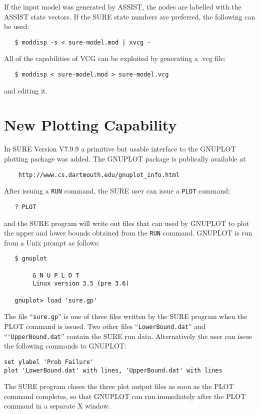 If the input model was generated by ASSIST, the nodes are labelled with the
ASSIST state vectors.  If the SURE state numbers are preferred, the following can be used:
\begin{verbatim}
   $ moddisp -s < sure-model.mod | xvcg -
\end{verbatim}
All of the capabilities of VCG can be exploited by generating a .vcg file:
\begin{verbatim}
   $ moddisp < sure-model.mod > sure-model.vcg
\end{verbatim}
and editing it.


\section{New Plotting Capability}

In SURE Version V7.9.9 a primitive but usable interface to the GNUPLOT plotting
package was added.  The GNUPLOT package is publically available at
\begin{verbatim}
    http://www.cs.dartmouth.edu/gnuplot_info.html
\end{verbatim}
After issuing a \verb|RUN| command, the SURE user can issue a \verb|PLOT| command:
\begin{verbatim}
   ? PLOT
\end{verbatim}
and the SURE program will write out files that can used by GNUPLOT to plot the 
upper and lower bounds obtained from the \verb|RUN| command.
GNUPLOT is run from a Unix prompt as follows:
\begin{verbatim}
   $ gnuplot

        G N U P L O T
        Linux version 3.5 (pre 3.6)

   gnuplot> load 'sure.gp'

\end{verbatim}
The file ``\verb|sure.gp|'' is one of three files written by the SURE
program when the PLOT command is issued.  Two other files ``\verb|LowerBound.dat|'' and
``\verb|'UpperBound.dat|'' contain the SURE run data.  Alternatively the
user can issue the following commands to GNUPLOT:
\begin{verbatim}
set ylabel 'Prob Failure' 
plot 'LowerBound.dat' with lines, 'UpperBound.dat' with lines
\end{verbatim}
The SURE program closes the three plot output files as soon as the PLOT
command completes, so that GNUPLOT can run immediately after the PLOT command
in a separate X window.

